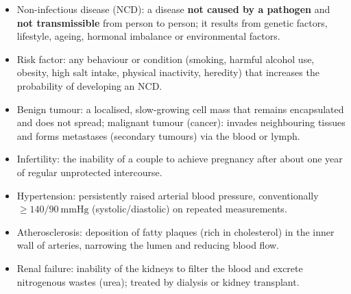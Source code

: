 \documentclass[11pt]{article}
\newcommand{\cle}[1]{{\popxbold\color{popdark}#1}}
\begin{document}
\begin{aretenir}
\begin{itemize}
\item \cle{Non-infectious disease} (NCD): a disease \textbf{not caused by a pathogen} and \textbf{not transmissible} from person to person; it results from genetic factors, lifestyle, ageing, hormonal imbalance or environmental factors.
\item \cle{Risk factor}: any behaviour or condition (smoking, harmful alcohol use, obesity, high salt intake, physical inactivity, heredity) that increases the probability of developing an NCD.
\item \cle{Benign tumour}: a localised, slow-growing cell mass that remains encapsulated and does not spread; \cle{malignant tumour} (cancer): invades neighbouring tissues and forms \cle{metastases} (secondary tumours) via the blood or lymph.
\item \cle{Infertility}: the inability of a couple to achieve pregnancy after about one year of regular unprotected intercourse.
\item \cle{Hypertension}: persistently raised arterial blood pressure, conventionally $\geq 140/90\ \mathrm{mmHg}$ (systolic/diastolic) on repeated measurements.
\item \cle{Atherosclerosis}: deposition of fatty plaques (rich in cholesterol) in the inner wall of arteries, narrowing the lumen and reducing blood flow.
\item \cle{Renal failure}: inability of the kidneys to filter the blood and excrete nitrogenous wastes (urea); treated by \cle{dialysis} or kidney transplant.
\end{itemize}
\end{aretenir}
\end{document}
